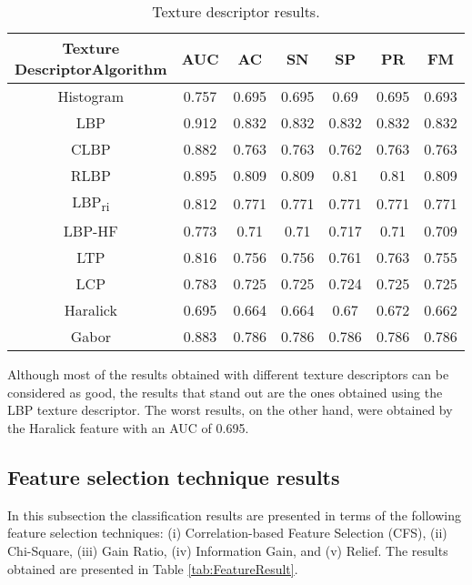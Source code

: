 \documentclass[review]{elsarticle}
\begin{document}
\begin{table}[h!]
	\centering
	\begin{tabular}{|c|c|c|c|c|c|c|}
		\hline 
		\backslashbox{Texture \\ Descriptor}{Algorithm} &AUC&AC&SN&SP&PR&FM\\
		\hline 
		Histogram	& 0.757 & 0.695  & 0.695 & 0.69  & 0.695  & 0.693 \\ 
		\hline
		\cellcolor{blue!25}	LBP 		&\cellcolor{blue!25}0.912  &\cellcolor{blue!25}0.832  &\cellcolor{blue!25}0.832  &\cellcolor{blue!25}0.832  &\cellcolor{blue!25}0.832  &\cellcolor{blue!25}0.832  \\
		\hline
		CLBP		& 0.882 & 0.763 & 0.763 & 0.762  & 0.763  & 0.763  \\ 
		\hline
		RLBP	 	& 0.895  & 0.809  & 0.809  & 0.81  & 0.81  & 0.809  \\
		\hline
		LBP\textsubscript{ri}	& 0.812  & 0.771  & 0.771  & 0.771  & 0.771  & 0.771  \\
		\hline
		LBP-HF 		& 0.773  & 0.71  & 0.71  & 0.717  & 0.71  & 0.709  \\ 
		\hline
		LTP		 	& 0.816  & 0.756  & 0.756  & 0.761  & 0.763  & 0.755  \\
		\hline
		LCP		 	& 0.783  & 0.725  & 0.725  & 0.724  & 0.725  & 0.725  \\
		\hline
		Haralick 	& 0.695  & 0.664  & 0.664  & 0.67  & 0.672  & 0.662  \\
		\hline
		Gabor		& 0.883  & 0.786  & 0.786  & 0.786  & 0.786  & 0.786  \\ 
		\hline
	\end{tabular} 
	\caption{Texture descriptor results.}
	\label{tab:TextureResult}
\end{table}

Although most of the results obtained with different texture descriptors can be considered as good, the results that stand out are the ones obtained using the LBP texture descriptor. The worst results, on the other hand, were obtained by the Haralick feature with an AUC of 0.695.

\subsection{Feature selection technique results}

In this subsection the classification results are presented in terms of the following feature selection techniques: (i) Correlation-based Feature Selection (CFS), (ii) Chi-Square, (iii) Gain Ratio, (iv) Information Gain, and (v) Relief. The results obtained are presented in Table \ref{tab:FeatureResult}.
\end{document}
